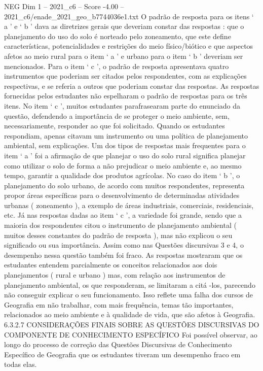 \begin{textsample}{NEG Dim 1 – 2021\_c6 – Score -4.00 – 2021\_c6/enade\_2021\_geo\_b7744036e1.txt}
O padrão de resposta para os itens ‘ a ’ e ‘ b ’ dava as diretrizes gerais que deveriam constar das respostas : que o planejamento do uso do solo é norteado pelo zoneamento, que este define características, potencialidades e restrições do meio físico/biótico e que aspectos afetos ao meio rural para o item ‘ a ’ e urbano para o item ‘ b ’ deveriam ser mencionados.
Para o item ‘ c ’, o padrão de resposta apresentava quatro instrumentos que poderiam ser citados pelos respondentes, com as explicações respectivas, e se referia a outros que poderiam constar das respostas.
As respostas fornecidas pelos estudantes não espelharam o padrão de respostas para os três itens.
No item ‘ c ’, muitos estudantes parafrasearam parte do enunciado da questão, defendendo a importância de se proteger o meio ambiente, sem, necessariamente, responder ao que foi solicitado.
Quando os estudantes respondiam, apenas citavam um instrumento ou uma política de planejamento ambiental, sem explicações.
Um dos tipos de respostas mais frequentes para o item ‘ a ’ foi a afirmação de que planejar o uso do solo rural significa planejar como utilizar o solo de forma a não prejudicar o meio ambiente e, ao mesmo tempo, garantir a qualidade dos produtos agrícolas.
No caso do item ‘ b ’, o planejamento do solo urbano, de acordo com muitos respondentes, representa propor áreas específicas para o desenvolvimento de determinadas atividades urbanas ( zoneamento ), a exemplo de áreas industriais, comerciais, residenciais, etc.
Já nas respostas dadas ao item ‘ c ’, a variedade foi grande, sendo que a maioria dos respondentes citou o instrumento de planejamento ambiental ( muitos desses constantes do padrão de resposta ), mas não explicou o seu significado ou sua importância.
Assim como nas Questões discursivas 3 e 4, o desempenho nessa questão também foi fraco.
As respostas mostraram que os estudantes entendem parcialmente os conceitos relacionados aos dois planejamentos ( rural e urbano ) mas, com relação aos instrumentos de planejamento ambiental, os que responderam, se limitaram a citá -los, parecendo não conseguir explicar o seu funcionamento.
Isso reflete uma falha dos cursos de Geografia em não trabalhar, com mais frequência, temas tão importantes, relacionados ao meio ambiente e à qualidade de vida, que são afetos à Geografia. 6.3.2.7 CONSIDERAÇÕES FINAIS SOBRE AS QUESTÕES DISCURSIVAS DO COMPONENTE DE CONHECIMENTO ESPECÍFICO Foi possível observar, ao longo do processo de correção das Questões Discursivas de Conhecimento Específico de Geografia que os estudantes tiveram um desempenho fraco em todas elas.

\end{textsample}
